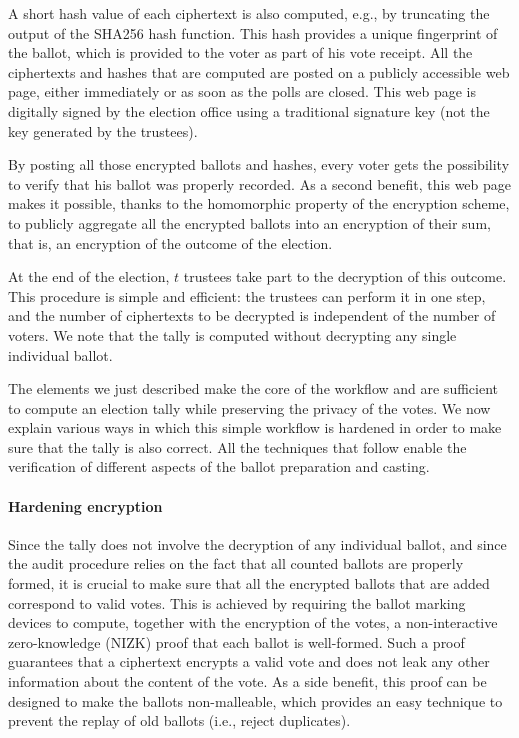A short hash value of each ciphertext is also computed, e.g., by
truncating the output of the SHA256 hash function.  This hash provides
a unique fingerprint of the ballot, which is provided to the voter as
part of his vote receipt. All the ciphertexts and hashes that are
computed are posted on a publicly accessible web page, either
immediately or as soon as the polls are closed. This web page is
digitally signed by the election office using a traditional signature
key (not the key generated by the trustees).

By posting all those encrypted ballots and hashes, every voter gets
the possibility to verify that his ballot was properly recorded. As a
second benefit, this web page makes it possible, thanks to the
homomorphic property of the encryption scheme, to publicly aggregate
all the encrypted ballots into an encryption of their sum, that is, an
encryption of the outcome of the election.

At the end of the election, $t$ trustees take part to the decryption
of this outcome. This procedure is simple and efficient: the trustees
can perform it in one step, and the number of ciphertexts to be
decrypted is independent of the number of voters. We note that the
tally is computed without decrypting any single individual ballot.

The elements we just described make the core of the workflow and are
sufficient to compute an election tally while preserving the privacy
of the votes. We now explain various ways in which this simple
workflow is hardened in order to make sure that the tally is also
correct. All the techniques that follow enable the verification of
different aspects of the ballot preparation and casting.

\paragraph{Hardening encryption}
\label{sec:hardening-encryption}
Since the tally does not involve the decryption of any individual
ballot, and since the audit procedure relies on the fact that all
counted ballots are properly formed, it is crucial to make sure that
all the encrypted ballots that are added correspond to valid votes.
This is achieved by requiring the ballot marking devices to compute,
together with the encryption of the votes, a non-interactive
zero-knowledge (NIZK) proof that each ballot is well-formed. Such a
proof guarantees that a ciphertext encrypts a valid vote and does not
leak any other information about the content of the vote. As a side
benefit, this proof can be designed to make the ballots non-malleable,
which provides an easy technique to prevent the replay of old ballots
(i.e., reject duplicates).

